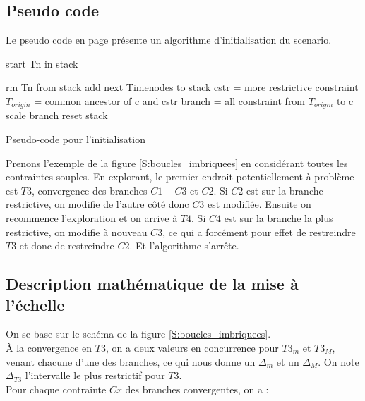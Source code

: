\documentclass[10pt,a4paper]{article}
\begin{document}
	\subsection{Pseudo code}
Le pseudo code en page \pageref{A:init} présente un algorithme d'initialisation du scenario.
	\begin{algorithm}[htp]
		\label{A:init}
		\begin{algorithmic}[2]
				\State start Tn in stack
					\State {}
				\EndWhile
			\EndFunction
			\State
		\end{algorithmic}

		\begin{algorithmic}[2]
				\State rm Tn from stack
						\State add next Timenodes to stack
					\Else
						\State cstr = more restrictive constraint
							\State $T_{origin}$ = common ancestor of c and cstr
							\State branch = all constraint from $T_{origin}$ to c
							\State scale branch
						\EndFor
						\State reset stack
					\EndIf
				\EndIf
			\EndFunction
		\end{algorithmic}
		\caption*{Pseudo-code pour l'initialisation}
	\end{algorithm}

	
Prenons l'exemple de la figure \ref{S:boucles_imbriquees} en considérant toutes les contraintes souples. En explorant, le premier endroit potentiellement à problème est $T3$, convergence des branches $C1 - C3$ et $C2$. Si $C2$ est sur la branche restrictive, on modifie de l'autre côté donc $C3$ est modifiée. Ensuite on recommence l'exploration et on arrive à $T4$. Si $C4$ est sur la branche la plus restrictive, on modifie à nouveau $C3$, ce qui a forcément pour effet de restreindre $T3$ et donc de restreindre $C2$. Et l'algorithme s'arrête.

	\subsection{Description mathématique de la mise à l'échelle}

On se base sur le schéma de la figure \ref{S:boucles_imbriquees}.\\
À la convergence en $T3$, on a deux valeurs en concurrence pour $T3_m$ et $T3_M$, venant chacune d'une des branches, ce qui nous donne un $\Delta_m$ et un $\Delta_M$. On note $\Delta_{T3}$ l'intervalle le plus restrictif pour $T3$.\\
Pour chaque contrainte $Cx$ des branches convergentes, on a :
\end{document}
